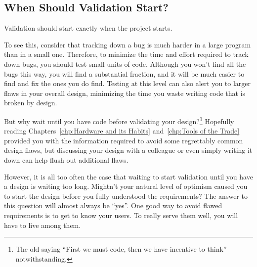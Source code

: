 \subsection{When Should Validation Start?}
\label{sec:debugging:When Should Validation Start?}

Validation should start exactly when the project starts.

To see this, consider that tracking down a bug is much harder in a large
program than in a small one.
Therefore, to minimize the time and effort required to track down bugs,
you should test small units of code.
Although you won't find all the bugs this way, you will find a substantial
fraction, and it will be much easier to find and fix the ones you do find.
Testing at this level can also alert you to larger flaws in your overall
design, minimizing the time you waste writing code that is broken
by design.

But why wait until you have code before validating your design?\footnote{
	The old saying ``First we must code, then we have incentive to
	think'' notwithstanding.}
Hopefully reading Chapters~\ref{chp:Hardware and its Habits}
and~\ref{chp:Tools of the Trade} provided you with the information
required to avoid some regrettably common design flaws,
but discussing your design with a colleague or even simply writing it
down can help flush out additional flaws.

However, it is all too often the case that waiting to start validation
until you have a design is waiting too long.
Mightn't your natural level of optimism caused you to start the design
before you fully understood the requirements?
The answer to this question will almost always be ``yes''.
One good way to avoid flawed requirements is to get to know your users.
To really serve them well, you will have to live among them.

\QuickQuizEnd

